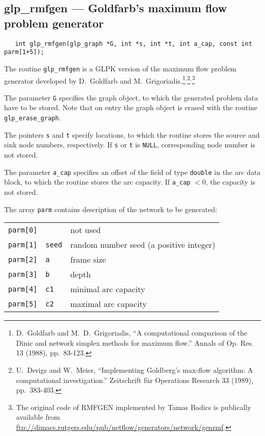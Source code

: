 \documentclass[11pt]{report}
\def\para#1{\noindent{\bf#1}}
\def\synopsis{\para{Synopsis}}
\def\description{\para{Description}}
\begin{document}
\subsection{glp\_rmfgen --- Goldfarb's maximum flow problem generator}

\synopsis

\begin{verbatim}
   int glp_rmfgen(glp_graph *G, int *s, int *t, int a_cap, const int parm[1+5]);
\end{verbatim}

\description

The routine \verb|glp_rmfgen| is a GLPK version of the maximum flow
problem generator developed by D.~Goldfarb and
M.~Grigoriadis.\footnote{D.~Goldfarb and M.~D.~Grigoriadis,
``A computational comparison of the Dinic and network simplex methods
for maximum flow.'' Annals of Op. Res. 13 (1988),
pp.~83-123.}$^{,}$\footnote{U.~Derigs and W.~Meier, ``Implementing
Goldberg's max-flow algorithm: A computational investigation.''
Zeitschrift f\"ur Operations Research 33 (1989),
pp.~383-403.}$^{,}$\footnote{The original code of RMFGEN implemented by
Tamas Badics is publically available from
\url{ftp://dimacs.rutgers.edu/pub/netflow/generators/network/genrmf}.}

The parameter \verb|G| specifies the graph object, to which the
generated problem data have to be stored. Note that on entry the graph
object is erased with the routine \verb|glp_erase_graph|.

\newpage

The pointers \verb|s| and \verb|t| specify locations, to which the
routine stores the source and sink node numbers, respectively. If
\verb|s| or \verb|t| is \verb|NULL|, corresponding node number is not
stored.

The parameter \verb|a_cap| specifies an offset of the field of type
\verb|double| in the arc data block, to which the routine stores the arc
capacity. If \verb|a_cap| $<0$, the capacity is not stored.

The array \verb|parm| contains description of the network to be
generated:

\begin{tabular}{@{}lll@{}}
\verb|parm[0]|&           &not used\\
\verb|parm[1]|&\verb|seed|&random number seed (a positive integer)\\
\verb|parm[2]|&\verb|a   |&frame size\\
\verb|parm[3]|&\verb|b   |&depth\\
\verb|parm[4]|&\verb|c1  |&minimal arc capacity\\
\verb|parm[5]|&\verb|c2  |&maximal arc capacity\\
\end{tabular}
\end{document}
